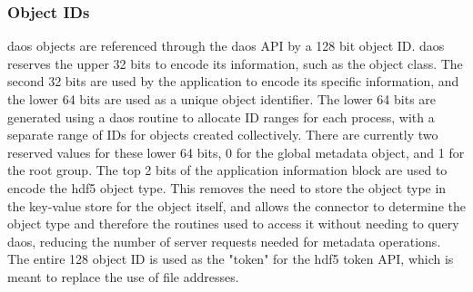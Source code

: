 \documentclass[../design_doc.tex]{subfiles}
\begin{document}
\subsubsection{Object IDs}


\acrshort{daos} objects are referenced through the \acrshort{daos} API by a 128 bit object ID. \acrshort{daos} reserves the upper 32 bits to encode its information, such as the object class. The second 32 bits are used by the application to encode its specific information, and the lower 64 bits are used as a unique object identifier. The lower 64 bits are generated using a \acrshort{daos} routine to allocate ID ranges for each process, with a separate range of IDs for objects created collectively. There are currently two reserved values for these lower 64 bits, 0 for the global metadata object, and 1 for the root group. The top 2 bits of the application information block are used to encode the \acrshort{hdf5} object type. This removes the need to store the object type in the key-value store for the object itself, and allows the \gls{connector} to determine the object type and therefore the routines used to access it without needing to query \acrshort{daos}, reducing the number of server requests needed for metadata operations. The entire 128 object ID is used as the "token" for the \acrshort{hdf5} token API, which is meant to replace the use of file addresses.
\end{document}
